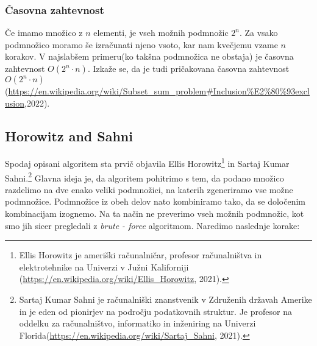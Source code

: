 \documentclass[12pt]{article}
\begin{document}
  \subsubsection{Časovna zahtevnost}
  Če imamo množico z $n$ elementi, je vseh možnih podmnožic $2^n$. \newline
  Za vsako podmnožico moramo še izračunati njeno vsoto, kar nam kvečjemu
  vzame $n$ korakov. \newline
  V najslabšem primeru(ko takšna podmnožica ne obstaja) je časovna zahtevnost $O(2^n \cdot n)$.
  Izkaže se, da je tudi pričakovana časovna zahtevnost $O(2^n \cdot n)$(\url{https://en.wikipedia.org/wiki/Subset_sum_problem#Inclusion%E2%80%93exclusion},2022).


 \subsection{Horowitz and Sahni}
 Spodaj opisani algoritem sta prvič objavila 
 Ellis Horowitz\footnote{Ellis Horowitz je ameriški računalničar, 
 profesor računalništva in elektrotehnike na Univerzi v Južni Kaliforniji (\url{https://en.wikipedia.org/wiki/Ellis_Horowitz}, 2021).} 
 in Sartaj Kumar Sahni.\footnote{Sartaj Kumar Sahni je računalniški znanstvenik v 
 Združenih državah Amerike in je eden od pionirjev na področju podatkovnih 
 struktur. Je profesor na oddelku za računalništvo, informatiko 
 in inženiring na Univerzi Florida(\url{https://en.wikipedia.org/wiki/Sartaj_Sahni}, 2021).}
 Glavna ideja je, da algoritem pohitrimo s tem, da podano množico razdelimo na dve enako veliki podmnožici, na katerih
 zgeneriramo vse možne podmnožice. Podmnožice iz obeh delov nato kombiniramo tako, da se 
 določenim kombinacijam izognemo. Na ta način ne preverimo vseh možnih podmnožic, kot
 smo jih sicer pregledali z \textit{brute - force} algoritmom.
\newline
 Naredimo naslednje korake:
\end{document}
